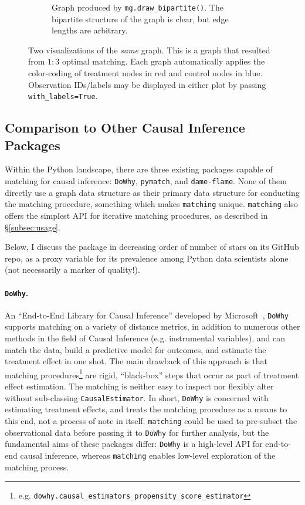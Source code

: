 \documentclass[11pt]{extarticle}
\begin{document}
\begin{figure}[h!]
\begin{subfigure}[t]{0.5\textwidth}
        \caption{Graph produced by \texttt{mg.draw\_bipartite()}. The bipartite structure of the graph is clear, but edge lengths are arbitrary.}
    \end{subfigure}
    \caption{Two visualizations of the \emph{same} graph. This is a graph that resulted from $1:3$ optimal matching. Each graph automatically applies the color-coding of treatment nodes in {\color{red}red} and control nodes in {\color{blue} blue}. Observation IDs/labels may be displayed in either plot by passing \texttt{with\_labels=True}.}
    \label{fig:draw_examples}
\end{figure}


\subsection{Comparison to Other Causal Inference Packages}

Within the Python landscape, there are three existing packages capable of matching for causal inference: \texttt{DoWhy}, \texttt{pymatch}, and \texttt{dame-flame}.
None of them directly use a graph data structure as their primary data structure for conducting the matching procedure, something which makes \texttt{matching} unique. \texttt{matching} also offers the simplest API for iterative matching procedures, as described in \S\ref{subsec:usage}.

Below, I discuss the package in decreasing order of number of stars on its GitHub repo, as a proxy variable for its prevalence among Python data scientists alone (not necessarily a marker of quality!).

\paragraph{\texttt{DoWhy}.} An ``End-to-End Library for Causal Inference'' developed by Microsoft~\parencite{dowhypaper}, \texttt{DoWhy} supports matching on a variety of distance metrics, in addition to numerous other methods in the field of Causal Inference (e.g. instrumental variables), and can match the data, build a predictive model for outcomes, and estimate the treatment effect in one shot.
The main drawback of this approach is that matching procedures\footnote{e.g. \texttt{dowhy.causal\_estimators\_propensity\_score\_estimator}} are rigid, ``black-box'' steps that occur as part of treatment effect estimation.
The matching is neither easy to inspect nor flexibly alter without sub-classing \texttt{CausalEstimator}. In short, \texttt{DoWhy} is concerned with estimating treatment effects, and treats the matching procedure as a means to this end, not a process of note in itself. \texttt{matching} could be used to pre-subset the observational data before passing it to \texttt{DoWhy} for further analysis, but the fundamental aims of these packages differ: \texttt{DoWhy} is a high-level API for end-to-end causal inference, whereas \texttt{matching} enables low-level exploration of the matching process.
\end{document}

